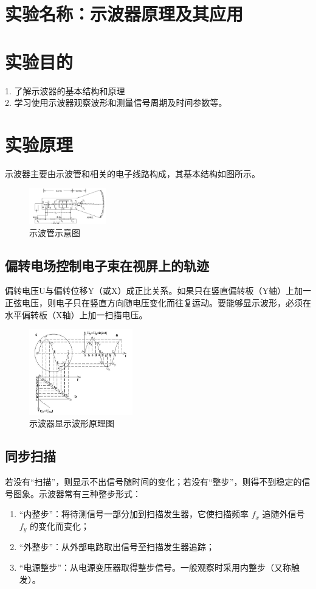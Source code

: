 \documentclass[12pt,a4paper]{article}
\begin{document}
	
	\section{实验名称：示波器原理及其应用}
	
	\section{实验目的}
	1. 了解示波器的基本结构和原理\\
	2. 学习使用示波器观察波形和测量信号周期及时间参数等。


	\section{实验原理}
	示波器主要由示波管和相关的电子线路构成，其基本结构如图所示。
		\begin{figure}[htbp]
		\centering
		\includegraphics[width=0.3\textwidth]{示波管示意图.png}
		\caption{示波管示意图}
		\label{fig:chart1}
		\end{figure}
	
		\setcounter{section}{3}
		\subsection{偏转电场控制电子束在视屏上的轨迹}
		偏转电压U与偏转位移Y（或X）成正比关系。如果只在竖直偏转板（Y轴）上加一正弦电压，则电子只在竖直方向随电压变化而往复运动。要能够显示波形，必须在水平偏转板（X轴）上加一扫描电压。
			\begin{figure}[htbp]
			\centering
			\includegraphics[width=0.40\textwidth]{示波器显示波形原理图.png}
			\caption{示波器显示波形原理图}
			\label{fig:chart1}
			\end{figure}

		\subsection{同步扫描}
		若没有“扫描”，则显示不出信号随时间的变化；若没有“整步”，则得不到稳定的信号图象。示波器常有三种整步形式：
		\begin{enumerate}
			\item “内整步”：将待测信号一部分加到扫描发生器，它使扫描频率 $f_x$ 追随外信号 $f_y$ 的变化而变化；
			\item “外整步”：从外部电路取出信号至扫描发生器追踪；
			\item “电源整步”：从电源变压器取得整步信号。一般观察时采用内整步（又称触发）。
		\end{enumerate}
\end{document}
